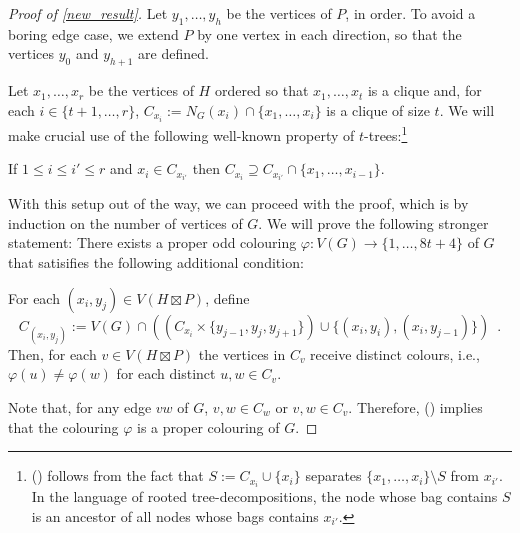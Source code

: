 \documentclass{patmorin}
\begin{document}
\begin{proof}[Proof of \cref{new_result}]
  Let $y_1,\ldots,y_h$ be the vertices of $P$, in order.  To avoid a boring edge case, we extend $P$ by one vertex in each direction, so that the vertices $y_0$ and $y_{h+1}$ are defined.

  Let $x_1,\ldots,x_r$ be the vertices of $H$ ordered so that $x_1,\ldots,x_{t}$ is a clique and, for each $i\in\{t+1,\ldots,r\}$, $C_{x_i}:=N_G(x_i)\cap\{x_1,\ldots,x_{i}\}$ is a clique of size $t$.
  We will make crucial use of the following well-known property of $t$-trees:\footnote{() follows from the fact that $S:=C_{x_i}\cup\{x_i\}$ separates $\{x_1,\ldots,x_i\}\setminus S$ from $x_{i'}$.  In the language of rooted tree-decompositions, the node whose bag contains $S$ is an ancestor of all nodes whose bags contains $x_{i'}$.}
  \begin{compactitem}[(\ding{74})]
    \item If $1\le i \le i'\le r$ and $x_i \in C_{x_{i'}}$ then $C_{x_i}\supseteq C_{x_{i'}}\cap\{x_1,\ldots,x_{i-1}\}$.
  \end{compactitem}

  With this setup out of the way, we can proceed with the proof, which is by induction on the number of vertices of $G$.  We will prove the following stronger statement:  There exists a proper odd colouring $\varphi:V(G)\to\{1,\ldots,8t+4\}$ of $G$ that satisifies the following additional condition:
  \begin{compactitem}[(\ding{96})]
    \item For each $(x_i,y_j)\in V(H\boxtimes P)$, define
    \[
      C_{(x_i,y_j)}:=V(G)\cap \left(\left(C_{x_i}\times\{y_{j-1}, y_{j},y_{j+1}\}\right)\cup\{(x_i,y_i),(x_i,y_{j-1})\}\right)
      \enspace .
    \]
    Then, for each $v\in V(H\boxtimes P)$ the vertices in $C_v$ receive distinct colours, i.e., $\varphi(u)\neq \varphi(w)$ for each distinct $u,w\in C_v$.
  \end{compactitem}
  Note that, for any edge $vw$ of $G$, $v,w \in C_w$ or $v,w\in C_v$.  Therefore, () implies that the colouring $\varphi$ is a proper colouring of $G$.




\end{proof}
\end{document}
